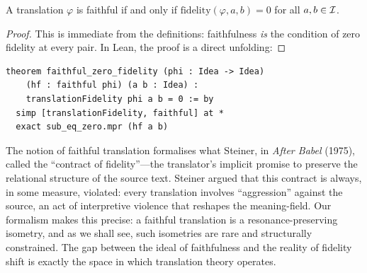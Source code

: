 \begin{theorem}
\label{thm:faithful-zero-fidelity}
A translation $\varphi$ is faithful if and only if
$\mathrm{fidelity}(\varphi, a, b) = 0$ for all $a, b \in \mathcal{I}$.
\end{theorem}

\begin{proof}
This is immediate from the definitions: faithfulness \emph{is} the
condition of zero fidelity at every pair.  In Lean, the proof is
a direct unfolding:
\end{proof}

\begin{lstlisting}
theorem faithful_zero_fidelity (phi : Idea -> Idea)
    (hf : faithful phi) (a b : Idea) :
    translationFidelity phi a b = 0 := by
  simp [translationFidelity, faithful] at *
  exact sub_eq_zero.mpr (hf a b)
\end{lstlisting}

\begin{interpretation}
\label{int:faithful-steiner}
The notion of faithful translation formalises what Steiner, in
\emph{After Babel} (1975), called the ``contract of fidelity''---the
translator's implicit promise to preserve the relational structure of the
source text.  Steiner argued that this contract is always, in some measure,
violated: every translation involves ``aggression'' against the source, an
act of interpretive violence that reshapes the meaning-field.  Our formalism
makes this precise: a faithful translation is a resonance-preserving isometry,
and as we shall see, such isometries are rare and structurally constrained.
The gap between the ideal of faithfulness and the reality of fidelity shift
is exactly the space in which translation theory operates.
\end{interpretation}

